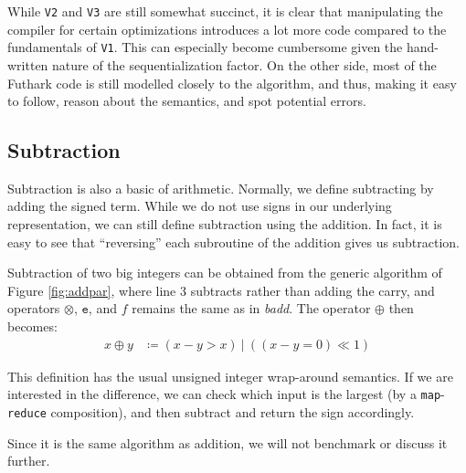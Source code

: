 While \texttt{V2} and \texttt{V3} are still somewhat succinct, it is clear that
manipulating the compiler for certain optimizations introduces a lot more code
compared to the fundamentals of \texttt{V1}. This can especially become
cumbersome given the hand-written nature of the sequentialization factor. On the
other side, most of the Futhark code is still modelled closely to the algorithm,
and thus, making it easy to follow, reason about the semantics, and spot
potential errors.


\subsection{Subtraction}
\label{subsec:sub}

Subtraction is also a basic of arithmetic. Normally, we define subtracting by
adding the signed term. While we do not use signs in our underlying
representation, we can still define subtraction using the addition. In fact, it
is easy to see that ``reversing'' each subroutine of the addition gives us
subtraction.

\begin{definition}
  Subtraction of two big integers can be obtained from the generic algorithm of
  Figure \ref{fig:addpar}, where line 3 subtracts rather than adding the carry,
  and operators $\otimes$, $\mathtt{e}$, and $f$ remains the same as in
  \textit{badd}. The operator $\oplus$ then becomes:
\begin{align}
  \label{eq:oplussub}
  x \oplus y &\coloneq (x - y > x)~|~((x - y = 0) \ll 1)
\end{align}
\end{definition}

This definition has the usual unsigned integer wrap-around semantics. If we are
interested in the difference, we can check which input is the largest (by a
\texttt{map}-\texttt{reduce} composition), and then subtract and return the sign
accordingly.

Since it is the same algorithm as addition, we will not benchmark or discuss it
further.

